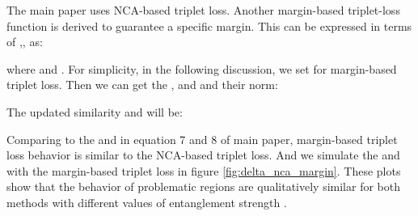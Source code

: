 \documentclass[runningheads]{llncs}
\begin{document}
 \begin{table*}
\begin{center}
\end{center}
\caption{Retrieval Performance on the SOP and In-shop datasets comparing to the best reported results with embedding dimension 512 trained on ResNet50}
\label{table:SOPICR}
\end{table*} 
The main paper uses NCA-based triplet loss.  Another margin-based triplet-loss function is derived to guarantee a specific margin.  This can be expressed in terms of ,, as:


where  and . For simplicity, in the following discussion, we set  for margin-based triplet loss. Then we can get the ,  and  and their norm:



The updated similarity  and  will be:

 
Comparing to the  and  in equation 7 and 8 of main paper, margin-based triplet loss behavior is similar to the NCA-based triplet loss. And we simulate the  and  with the margin-based triplet loss in figure \ref{fig:delta_nca_margin}. These plots show that the behavior of problematic regions are qualitatively similar for both methods with different values of entanglement strength .
\end{document}
